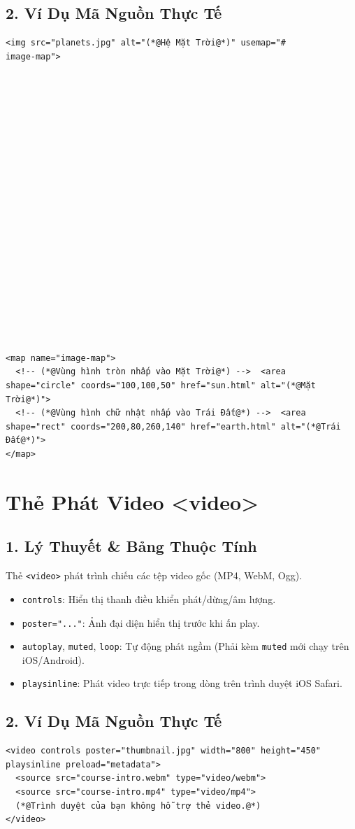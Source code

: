 \documentclass[11pt,oneside]{book}
\newcommand{\codeinline}[1]{\textcolor{accentOrange}{\texttt{#1}}}
\begin{document}
\subsection{2. Ví Dụ Mã Nguồn Thực Tế}
\begin{lstlisting}[language=HTML5, caption={Ví dụ tạo vùng nhấp chuột tương tác trên ảnh}]
<img src="planets.jpg" alt="(*@Hệ Mặt Trời@*)" usemap="#                    image-map">





















<map name="image-map">
  <!-- (*@Vùng hình tròn nhấp vào Mặt Trời@*) -->  <area shape="circle" coords="100,100,50" href="sun.html" alt="(*@Mặt Trời@*)">
  <!-- (*@Vùng hình chữ nhật nhấp vào Trái Đất@*) -->  <area shape="rect" coords="200,80,260,140" href="earth.html" alt="(*@Trái Đất@*)">
</map>
\end{lstlisting}

\section{Thẻ Phát Video <video>}
\subsection{1. Lý Thuyết \& Bảng Thuộc Tính}
Thẻ \codeinline{<video>} phát trình chiếu các tệp video gốc (MP4, WebM, Ogg).

\begin{itemize}
    \item \codeinline{controls}: Hiển thị thanh điều khiển phát/dừng/âm lượng.
    \item \codeinline{poster="..."}: Ảnh đại diện hiển thị trước khi ấn play.
    \item \codeinline{autoplay}, \codeinline{muted}, \codeinline{loop}: Tự động phát ngầm (Phải kèm \codeinline{muted} mới chạy trên iOS/Android).
    \item \codeinline{playsinline}: Phát video trực tiếp trong dòng trên trình duyệt iOS Safari.
\end{itemize}

\subsection{2. Ví Dụ Mã Nguồn Thực Tế}
\begin{lstlisting}[language=HTML5, caption={Ví dụ thẻ video phát chuẩn đa thiết bị}]
<video controls poster="thumbnail.jpg" width="800" height="450" playsinline preload="metadata">
  <source src="course-intro.webm" type="video/webm">
  <source src="course-intro.mp4" type="video/mp4">
  (*@Trình duyệt của bạn không hỗ trợ thẻ video.@*)
</video>
\end{lstlisting}
\end{document}
